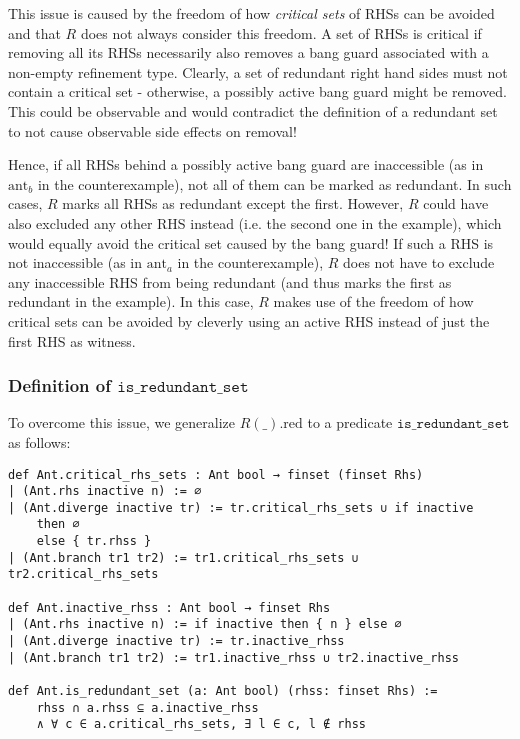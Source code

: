 This issue is caused by the freedom of how \textit{critical sets} of RHSs can be avoided and that $R$ does not always consider this freedom.
A set of RHSs is critical if removing all its RHSs necessarily also removes a bang guard associated with a non-empty refinement type.
Clearly, a set of redundant right hand sides must not contain a critical set - otherwise, a possibly active bang guard might be removed. This could be observable and would contradict the definition of a redundant set to not cause observable side effects on removal!

Hence, if all RHSs behind a possibly active bang guard are inaccessible (as in $\mathrm{ant}_b$ in the counterexample), not all of them can be marked as redundant.
In such cases, $R$ marks all RHSs as redundant except the first.
However, $R$ could have also excluded any other RHS instead (i.e. the second one in the example), which would equally avoid the critical set caused by the bang guard!
If such a RHS is not inaccessible (as in $\mathrm{ant}_a$ in the counterexample), $R$ does not have to exclude any inaccessible RHS from being redundant (and thus marks the first as redundant in the example). In this case, $R$ makes use of the freedom of how critical sets can be avoided by cleverly using an active RHS instead of just the first RHS as witness.

\subsubsection{Definition of $\mathtt{is\_redundant\_set}$}

To overcome this issue, we generalize $R(\_).\mathrm{red}$ to a predicate $\mathtt{is\_redundant\_set}$ as follows:

\begin{verbatim}
def Ant.critical_rhs_sets : Ant bool → finset (finset Rhs)
| (Ant.rhs inactive n) := ∅
| (Ant.diverge inactive tr) := tr.critical_rhs_sets ∪ if inactive
    then ∅
    else { tr.rhss }
| (Ant.branch tr1 tr2) := tr1.critical_rhs_sets ∪ tr2.critical_rhs_sets

def Ant.inactive_rhss : Ant bool → finset Rhs
| (Ant.rhs inactive n) := if inactive then { n } else ∅
| (Ant.diverge inactive tr) := tr.inactive_rhss
| (Ant.branch tr1 tr2) := tr1.inactive_rhss ∪ tr2.inactive_rhss

def Ant.is_redundant_set (a: Ant bool) (rhss: finset Rhs) :=
    rhss ∩ a.rhss ⊆ a.inactive_rhss
    ∧ ∀ c ∈ a.critical_rhs_sets, ∃ l ∈ c, l ∉ rhss
\end{verbatim}

